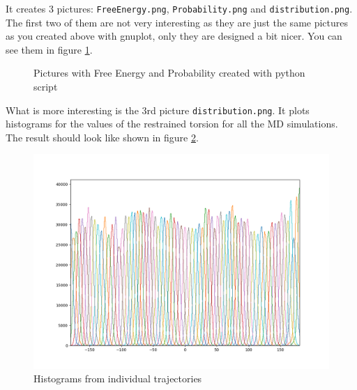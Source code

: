 \documentclass[a4paper,11pt]{scrartcl}
\begin{document}
It creates 3 pictures: \texttt{FreeEnergy.png}, \texttt{Probability.png} and \texttt{distribution.png}. The first two of them are not very interesting as they are just the same pictures as you created above with gnuplot, only they are designed a bit nicer. You can see them in figure \ref{fig:wham_python}.

\begin{figure} [htb]
	\caption{Pictures with Free Energy and Probability created with python script}
	\label{fig:wham_python}
\end{figure}

What is more interesting is the 3rd picture \texttt{distribution.png}. It plots histograms for the values of the restrained torsion for all the MD simulations. The result should look like shown in figure \ref{fig:distribution}.

\begin{figure}[htb]
	\centering
	\includegraphics[width=\textwidth]{Img/distribution.png}
	\caption{Histograms from individual trajectories}
	\label{fig:distribution}
\end{figure}
\end{document}
